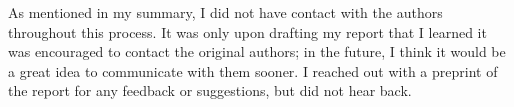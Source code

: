 As mentioned in my summary, I did not have contact with the authors throughout this process. It was only upon drafting my report that I learned it was encouraged to contact the original authors; in the future, I think it would be a great idea to communicate with them sooner. I reached out with a preprint of the report for any feedback or suggestions, but did not hear back. 



%
%